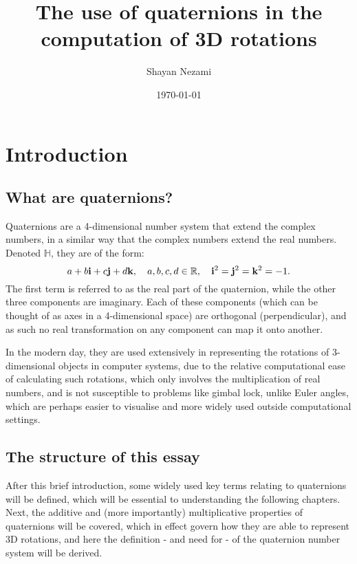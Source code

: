 \documentclass[10pt]{article}
\title{The use of quaternions in the computation of 3D rotations}
\author{Shayan Nezami}
\date{\today}
\begin{document}
\maketitle	
\pagebreak

\tableofcontents
\pagebreak

\section{Introduction}

\subsection{What are quaternions?}

Quaternions are a 4-dimensional number system that extend the complex numbers, in a similar way that the complex numbers extend the real numbers. Denoted $\mathbb{H}$, they are of the form:
\begin{equation}
    a + b\vb{i} + c\vb{j} + d\vb{k}, \quad a, b, c, d \in \mathbb{R}, \quad \vb{i}^2=\vb{j}^2=\vb{k}^2=-1.
\end{equation}
The first term is referred to as the real part of the quaternion, while the other three components are imaginary. Each of these components (which can be thought of as axes in a 4-dimensional space) are orthogonal (perpendicular), and as such no real transformation on any component can map it onto another.

In the modern day, they are used extensively in representing the rotations of 3-dimensional objects in computer systems, due to the relative computational ease of calculating such rotations, which only involves the multiplication of real numbers, and is not susceptible to problems like gimbal lock, unlike Euler angles, which are perhaps easier to visualise and more widely used outside computational settings. \cite{QuaternionWiki}

\subsection{The structure of this essay}

After this brief introduction, some widely used key terms relating to quaternions will be defined, which will be essential to understanding the following chapters. Next, the additive and (more importantly) multiplicative properties of quaternions will be covered, which in effect govern how they are able to represent 3D rotations, and here the definition - and need for - of the quaternion number system will be derived.
\end{document}
